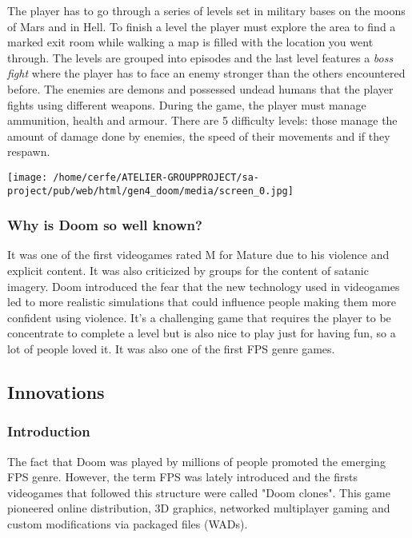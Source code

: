 \documentclass[a4paper,10pt]{book}
\begin{document}
          The player has to go through a series of levels set in military
          bases on the moons of Mars and in Hell. To finish a level the player must
          explore the area to find a marked exit room while walking a map is
          filled with the location you went through. The levels are grouped into episodes
          and the last level features a  \textit{boss fight } where the player has to face
          an enemy stronger than the others encountered before.  
          The enemies are demons and possessed undead humans that the
          player fights using different weapons. During the game, the player must
          manage ammunition, health and armour. There are 5 difficulty levels:
          those manage the amount of damage done by enemies, the speed of
          their movements and if they respawn.  
 
 
 \texttt{[image: /home/cerfe/ATELIER-GROUPPROJECT/sa-project/pub/web/html/gen4\_doom/media/screen\_0.jpg]}
 
 
 \subsubsection{Why is Doom so well known? }
 
          It was one of the first videogames rated M for Mature due
          to his violence and explicit content. It was also criticized by groups
          for the content of satanic imagery. Doom introduced the fear that the new
          technology used in videogames led to more realistic simulations that could
          influence people making them more confident using violence.  
          It's a challenging game that requires the player to be concentrate to
          complete a level but is also nice to play just for having fun, so a lot
          of people loved it. It was also one of the first FPS genre games.  
 
 
 \subsection{Innovations }
 
 \subsubsection{Introduction }
 
          The fact that Doom was played by millions of people promoted the emerging
          FPS genre. However, the term FPS was lately introduced and the firsts videogames
          that followed this structure were called "Doom clones".
          This game pioneered online distribution, 3D graphics, networked
          multiplayer gaming and custom modifications via packaged files (WADs).  
 
\end{document}
